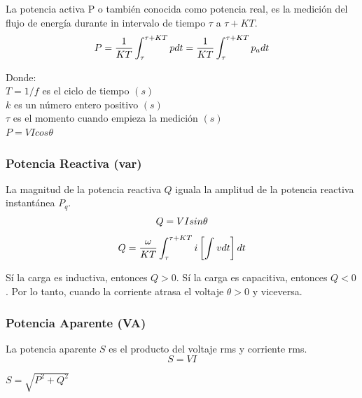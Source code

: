 La potencia activa P o también conocida como potencia real, es la medición del flujo de energía durante in intervalo de tiempo $\tau$ a $\tau + KT$. \cite{A30}\\

\begin{equation}\label{EQ16}
P=\frac{1}{KT}\int_{\tau}^{\tau + KT}pdt = \frac{1}{KT}\int_{\tau}^{\tau + KT}p_{a}dt\\
\end{equation}

Donde:\\
$T=1/f$ es el ciclo de tiempo $(s)$\\
$k$     es un número entero positivo $(s)$\\
$\tau$  es el momento cuando empieza la medición $(s)$\\
$P=VIcos \theta$\\
\subsubsection{Potencia Reactiva (var)}

La magnitud de la potencia reactiva $Q$ iguala la amplitud de la potencia reactiva instantánea $P_{q}$.\cite{A30}\\
\begin{equation}\label{EQ17}
Q=VIsin \theta\\
\end{equation}
\begin{equation}\label{EQ18}
Q=\frac{\omega}{KT}\int_{\tau}^{\tau + KT}i\left[\int_{}^{}vdt\right] dt\\
\end{equation}

Sí la carga es inductiva, entonces $Q>0$. Sí la carga es capacitiva, entonces $Q<0$. Por lo tanto, cuando la corriente atrasa el voltaje $\theta>0$ y viceversa.\\
\subsubsection{Potencia Aparente (VA)}

La potencia aparente $S$ es el producto del voltaje rms y corriente rms.\cite{A30}\\

\begin{equation}\label{EQ19}
S=VI
\end{equation}

$S=\sqrt{P^2+Q^2}$ \\

